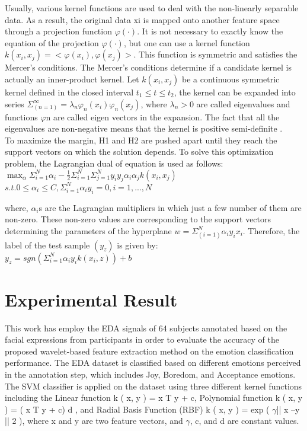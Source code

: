 Usually, various kernel functions are used to deal with the non-linearly separable data. 
As a result, the original data xi is mapped onto another feature space through a 
projection function ${\varphi(\cdot)}$. It is not necessary to exactly know the equation of the 
projection ${\varphi(\cdot)}$, but one can use a kernel function ${k(x_i,x_j)=<\varphi(x_i),\varphi(x_j)>}$. 
This function is symmetric and satisfies the Mercer’s conditions. The Mercer’s conditions determine 
if a candidate kernel is actually an inner-product kernel. Let ${k(x_i,x_j)}$ be a continuous 
symmetric kernel defined in the closed interval ${t_1\leq t\leq t_2}$, the kernel can be expanded 
into series ${\Sigma_(n=1)^\infty = \lambda_n\varphi_n(x_i)\varphi_n(x_j)}$, where 
${\lambda_n > 0}$ are called eigenvalues and functions $\varphi$n are called eigen vectors in the expansion. 
The fact that all the eigenvalues are non-negative means that the kernel is positive 
semi-definite \cite{SupportVector1995}. \\

To maximize the margin, H1 and H2 are pushed apart until they reach the support vectors 
on which the solution depends. To solve this optimization problem, the Lagrangian dual 
of equation is used as follows:\\

$\max_\alpha \Sigma_{i=1}^{N} \alpha_i - \frac{1}{2} \Sigma_{i=1}^{N} \Sigma_{j=1}^{N} y_i y_j \alpha_i \alpha_j k(x_i, x_j)$\newline
$s.t. 0 \le \alpha_i \le C, \Sigma_{i=1}^{N} \alpha_i y_i = 0, i = 1, ..., N$\newline

where, ${\alpha_i}$s are the Lagrangian multipliers in which just a few number of them are 
non-zero. These non-zero values are corresponding to the support vectors determining 
the parameters of the hyperplane ${w = \Sigma_(i=1)^N\alpha_iy_ix_i }$. Therefore, the label 
of the test sample ${(y_z)}$ is given by:\\

$y_z = sgn(\Sigma_{i=1}^{N} \alpha_i y_i k(x_i, z)) + b$\newline


\section{Experimental Result}
This work has employ the EDA signals of 64 subjects annotated based on the facial expressions from participants
in order to evaluate the accuracy of the proposed wavelet-based feature extraction method on the emotion classification
performance. The EDA dataset is classified based on different emotions perceived in the annotation step, which includes 
Joy, Boredom, and Acceptance emotions. The SVM classifier is applied on the dataset using three different kernel 
functions including the Linear function k ( x, y ) = x T y + c, Polynomial function k ( x, y ) = ( x T y + c) d , 
and Radial Basis Function (RBF) k ( x, y ) = exp ( $\gamma$|| x –y || 2 ), where x and y are two feature vectors, 
and $\gamma$, c, and d are constant values. \\

